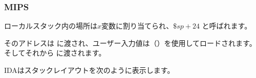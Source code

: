 \subsubsection{MIPS}

ローカルスタック内の場所は$x$変数に割り当てられ、$\$sp+24$ と呼ばれます。

そのアドレスは \scanf に渡され、ユーザー入力値は（）を使用してロードされます。
そしてそれから \printf に渡されます。



IDAはスタックレイアウトを次のように表示します。



